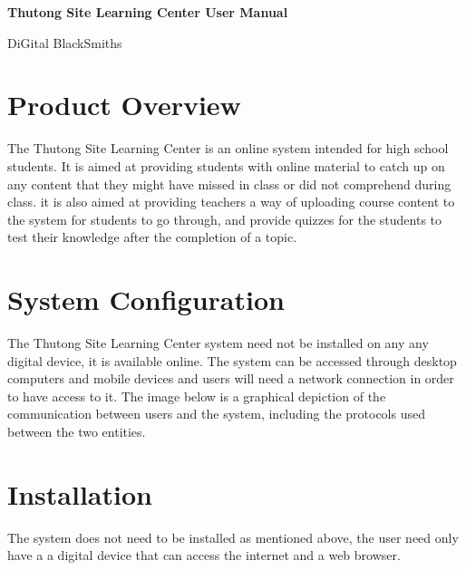 \documentclass[12pt,a4paper]{article}
\begin{document}
	\begin{titlepage}
		\centering
		\vspace*{\fill}
		
		\vspace*{0.5cm}
		
		\huge\bfseries
		Thutong Site Learning Center User Manual
		
		\vspace*{0.5cm}
		
		\large DiGital BlackSmiths
		
		\vspace*{\fill}
	\end{titlepage}

	\section{Product Overview}
		The Thutong Site Learning Center is an online system intended for high school students. It is aimed at providing students with online material to catch up on any content that they might have missed in class or did not comprehend during class. it is also aimed at providing teachers a way of uploading course content to the system for students to go through, and provide quizzes for the students to test their knowledge after the completion of a topic. 
	
	\section{System Configuration}
		The Thutong Site Learning Center system need not be installed on any any digital device, it is available online. The system can be accessed through desktop computers and mobile devices and users will need a network connection in order to have access to it. The image below is a graphical depiction of the communication between users and the system, including the protocols used between the two entities.
		
		
	\section{Installation}
		The system does not need to be installed as mentioned above, the user need only have a a digital device that can access the internet and a web browser.
		
		  
	
\end{document}
